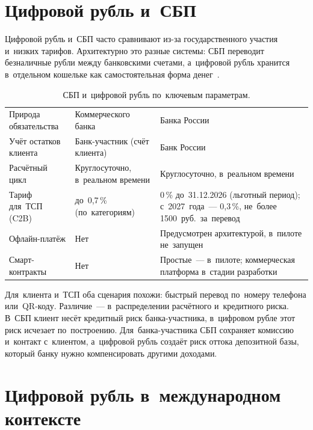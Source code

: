\section{Цифровой рубль и~СБП}\label{sec:cbdc-vs-sbp}

Цифровой рубль и~СБП часто сравнивают из-за государственного участия и~низких
тарифов. Архитектурно это разные системы: СБП переводит безналичные рубли между
банковскими счетами, а~цифровой рубль хранится в~отдельном кошельке как
самостоятельная форма денег~\cite{cbr-digital-ruble}.

\begin{table}[!ht]
  \caption{СБП и~цифровой рубль по~ключевым параметрам.}\label{tab:cbdc-vs-sbp}
  \begingroup
  \tablesetup
  \setlength{\tabcolsep}{6pt}
  \begin{tabularx}{\textwidth}{
      @{}P{0.24\textwidth} Y Y@{}
    }
    \toprule
    \headrow
    \thd{} &  &  \\
    \midrule
    Природа обязательства & Коммерческого банка & Банка России \\
    \rowsep
    Учёт остатков клиента & Банк-участник (счёт клиента) & Банк России \\
    \rowsep
    Расчётный цикл & Круглосуточно, в~реальном времени & Круглосуточно, в~реальном времени \\
    \rowsep
    Тариф для~ТСП (C2B) & до~0,7\,\% (по~категориям) & 0\,\% до~31.12.2026
    (льготный период); с~2027~года~--- 0,3\,\%, не~более 1500~руб.\ за~перевод~\cite{cbr-dr-tariffs-2026} \\
    \rowsep
    Офлайн-платёж & Нет & Предусмотрен архитектурой, в~пилоте не~запущен \\
    \rowsep
    Смарт-контракты & Нет & Простые~--- в~пилоте; коммерческая
    платформа в~стадии разработки \\
    \bottomrule
  \end{tabularx}\par
  \endgroup
\end{table}

Для~клиента и~ТСП оба сценария похожи: быстрый перевод по~номеру телефона
или~QR-коду. Различие~--- в~распределении расчётного и~кредитного риска.
В~СБП клиент несёт кредитный риск банка-участника, в~цифровом рубле этот риск
исчезает по~построению. Для~банка-участника СБП сохраняет комиссию и~контакт
с~клиентом, а~цифровой рубль создаёт риск оттока депозитной базы, который банку
нужно компенсировать другими доходами.

\section{Цифровой рубль в~международном контексте}\label{sec:cbdc-international}

